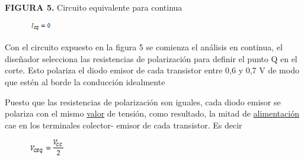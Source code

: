 \documentclass[12pt]{article}
\begin{document}

\par

\textbf{FIGURA 5.} Circuito equivalente para continua\par




\begin{figure}[H]
	\begin{Center}
		\includegraphics[width=0.44in,height=0.15in]{./media/image6.gif}
	\end{Center}
\end{figure}



Con el circuito expuesto en la figura 5 se comienza el análisis en continua, el diseñador selecciona las resistencias de polarización para definir el punto Q en el corte. Esto polariza el diodo emisor de cada transistor entre 0,6 y 0,7 V de modo que estén al borde la conducción idealmente \par

Puesto que las resistencias de polarización son iguales, cada diodo emisor se polariza con el mismo \href{https://www.monografias.com/trabajos14/nuevmicro/nuevmicro.shtml}{valor} de tensión, como resultado, la mitad de \href{https://www.monografias.com/Salud/Nutricion/}{alimentación} cae en los terminales colector- emisor de cada transistor. Es decir\par




\begin{figure}[H]
	\begin{Center}
		\includegraphics[width=0.65in,height=0.3in]{./media/image7.gif}
	\end{Center}
\end{figure}


\end{document}
